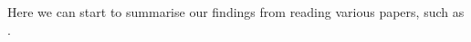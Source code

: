 \documentclass[a4paper,12pt]{article}
\begin{document}
Here we can start to summarise our findings from reading various
papers, such as \cite{Kempf2016}.
  
  
\end{document}
